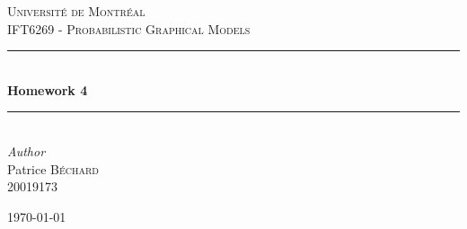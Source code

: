 \documentclass[11pt]{article}
\begin{document}
\begin{titlepage} %
	\newcommand{\HRule}{\rule{\linewidth}{0.5mm}} %
	
	\center %
	\vspace*{2cm}
	
	
	\textsc{\LARGE Universit\'e de Montr\'eal}\\[1cm] %
	\textsc{\Large IFT6269 - Probabilistic Graphical Models}\\[2cm] %
		
	
	\HRule\\[0.5cm]
	{\huge\bfseries Homework 4}\\[0.2cm] %
	\HRule\\[3cm]
	
	
	{\large\textit{Author}}\\
	 Patrice \textsc{B\'echard}\\ %
	 20019173
	
	
	\vfill\vfill\vfill %
	
	{\large\today} %
	
	
	 
	
	\vfill %
	
\end{titlepage}
\end{document}
